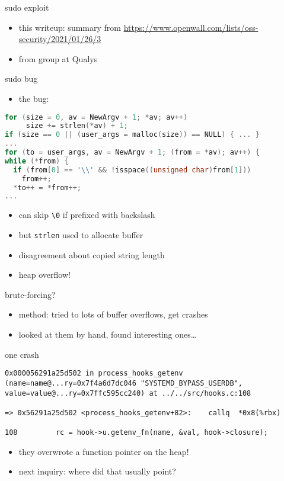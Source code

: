 \begin{frame}{sudo exploit}
\begin{itemize}
\item this writeup: summary from \url{https://www.openwall.com/lists/oss-security/2021/01/26/3}
\item from group at Qualys
\end{itemize}
\end{frame}

\begin{frame}[fragile,label=sudoBug]{sudo bug}
\begin{itemize}
\item the bug:
\end{itemize}
\begin{lstlisting}[language=C++,style=smaller]
for (size = 0, av = NewArgv + 1; *av; av++)
     size += strlen(*av) + 1;
if (size == 0 || (user_args = malloc(size)) == NULL) { ... }
...
for (to = user_args, av = NewArgv + 1; (from = *av); av++) {
while (*from) {
  if (from[0] == '\\' && !isspace((unsigned char)from[1]))
    from++;
  *to++ = *from++;
...
\end{lstlisting}
\begin{itemize}
\item can skip \texttt{\textbackslash 0} if prefixed with backslash
\item but \texttt{strlen} used to allocate buffer
\item disagreement about copied string length
\item heap overflow!
\end{itemize}
\end{frame}

\begin{frame}{brute-forcing?}
\begin{itemize}
\item method: tried to lots of buffer overflows, get crashes
\item looked at them by hand, found interesting ones\ldots
\end{itemize}
\end{frame}

\begin{frame}[fragile,label=oneCrash]{one crash}
\begin{lstlisting}[language={},style=script]
0x000056291a25d502 in process_hooks_getenv (name=name@...ry=0x7f4a6d7dc046 "SYSTEMD_BYPASS_USERDB", value=value@...ry=0x7ffc595cc240) at ../../src/hooks.c:108

=> 0x56291a25d502 <process_hooks_getenv+82>:    callq  *0x8(%rbx)

108         rc = hook->u.getenv_fn(name, &val, hook->closure);
\end{lstlisting}
\begin{itemize}
\item they overwrote a function pointer on the heap!
\item next inquiry: where did that usually point?
\end{itemize}
\end{frame}

